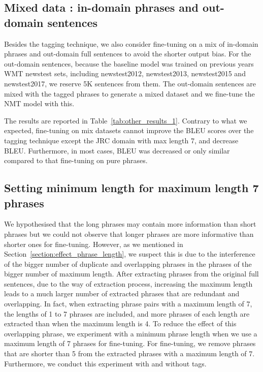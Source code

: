 \subsection{Mixed data : in-domain phrases and out-domain sentences}

Besides the tagging technique, we also consider fine-tuning on a mix of in-domain phrases and out-domain full sentences to avoid the shorter output bias. For the out-domain sentences, because the baseline model was trained on previous years WMT newstest sets, including newstest2012, newstest2013, newstest2015 and newstest2017, we reserve 5K sentences from them. The out-domain sentences are mixed with the tagged phrases to generate a mixed dataset and we fine-tune the NMT model with this.

The results are reported in Table~\ref{tab:other_results_1}. Contrary to what we expected, fine-tuning on mix datasets cannot improve the BLEU scores over the tagging technique except the JRC domain with max length 7, and decrease BLEU. Furthermore, in most cases, BLEU was decreased or only similar compared to that fine-tuning on pure phrases.


\subsection{Setting minimum length for maximum length 7 phrases}

We hypothesised that the long phrases may contain more information than short phrases but we could not observe that longer phrases are more informative than shorter ones for fine-tuning. 
However, as we mentioned in Section~\ref{section:effect_phrase_length}, we suspect this is due to the interference of the bigger number of duplicate and overlapping phrases in the phrases of the bigger number of maximum length. After extracting phrases from the original full sentences, due to the way of extraction process, increasing the maximum length leads to a much larger number of extracted phrases that are redundant and overlapping. In fact, when extracting phrase pairs with a maximum length of 7, the lengths of 1 to 7 phrases are included, and more phrases of each length are extracted than when the maximum length is 4. 
To reduce the effect of this overlapping phrase, we experiment with a minimum phrase length when we use a maximum length of 7 phrases for fine-tuning. For fine-tuning, we remove phrases that are shorter than 5 from the extracted phrases with a maximum length of 7. Furthermore, we conduct this experiment with and without tags. 


